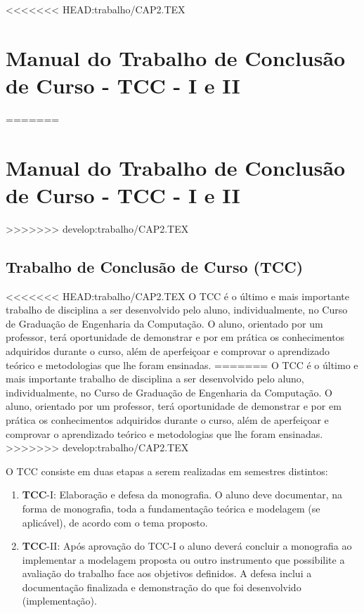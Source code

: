 <<<<<<< HEAD:trabalho/CAP2.TEX
﻿\chapter{Manual do Trabalho de Conclusão de Curso - TCC - I e II}
=======
\chapter{Manual do Trabalho de Conclus\~ao de Curso - TCC - I e II}
>>>>>>> develop:trabalho/CAP2.TEX
\label{cap:manual TCC}


\section{Trabalho de Conclusão de Curso (TCC)}

<<<<<<< HEAD:trabalho/CAP2.TEX
O TCC é o último e mais importante trabalho de disciplina a ser desenvolvido pelo aluno, individualmente, 
no Curso de Graduação de Engenharia da Computação. O aluno, orientado por um professor, terá oportunidade de demonstrar e por em prática 
os conhecimentos adquiridos durante o curso, além de aperfeiçoar e comprovar o aprendizado teórico e metodologias que lhe foram ensinadas.
=======
O TCC \'e o último e mais importante trabalho de disciplina a ser desenvolvido pelo aluno, individualmente, 
no Curso de Graduação de Engenharia da Computação. O aluno, orientado por um professor, terá oportunidade de demonstrar e por em prática 
os conhecimentos adquiridos durante o curso, al\'em de aperfeiçoar e comprovar o aprendizado teórico e metodologias que lhe foram ensinadas.
>>>>>>> develop:trabalho/CAP2.TEX

O TCC consiste em duas etapas a serem realizadas em semestres distintos:

	\begin{enumerate}
		\item \textbf{TCC}-I: Elaboração e defesa da monografia.
		O aluno deve documentar, na forma de monografia, toda a fundamentação teórica e modelagem (se aplicável), de acordo com o tema proposto.
		
		\item \textbf{TCC}-II: Após aprovação do TCC-I o aluno deverá concluir a monografia ao implementar a modelagem proposta ou outro instrumento que possibilite a 			avaliação do trabalho face aos objetivos definidos. A defesa inclui a documentação finalizada e demonstração do que foi desenvolvido (implementação).
	\end{enumerate}
	
